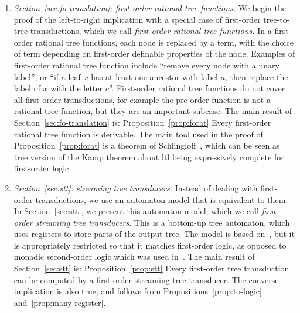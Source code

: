 \begin{enumerate}
    \item \emph{Section~\ref{sec:fo-translation}: first-order rational tree functions.} We begin the proof of the left-to-right  implication  with a special case of first-order tree-to-tree transductions, which we call \emph{first-order rational tree functions.} In a first-order rational tree functions, each node is replaced by a term, with the choice of term depending on first-order definable properties of the node. Examples of first-order rational tree function include  ``remove every node with a unary label'', or ``if a leaf $x$ has at least one ancestor with label $a$, then replace the label of $x$ with the letter $c$''. First-order rational tree functions do not cover all first-order transductions, for example the pre-order function is not a rational tree function, but they are an important subcase.
    The main result of Section~\ref{sec:fo-translation} is:
    \announce
    {Proposition~\ref{prop:forat}}
    {Every first-order rational tree function is derivable.}
    The main tool used in the proof of Proposition~\ref{prop:forat} is a theorem of Schlingloff~\cite[Theorem 2.6]{schlingloff1992expressive}, which can be seen as tree version of the Kamp theorem about {\sc ltl} being  expressively complete for first-order logic.  
    \item \emph{Section~\ref{sec:stt}: streaming tree transducers. }Instead of dealing with first-order transductions, we use an automaton model that is equivalent to them. In Section~\ref{sec:stt}, we present  this  automaton model, which we call \emph{first-order streaming tree transducers}. This  is a bottom-up tree automaton, which uses registers to store parts of the output tree. The model is based on~\cite{alur2017streaming}, but it is  appropriately restricted so that it matches first-order logic, as opposed to monadic second-order logic which was used in~\cite{alur2017streaming}. The main result of Section~\ref{sec:stt} is:
    \announce
    {Proposition~\ref{prop:stt}}
    {Every first-order  tree transduction can be computed by a first-order streaming tree transducer.}
    The converse implication is also true, and follows from Propositions~\ref{prop:to-logic} and~\ref{prop:many-register}.
    

\end{enumerate}
